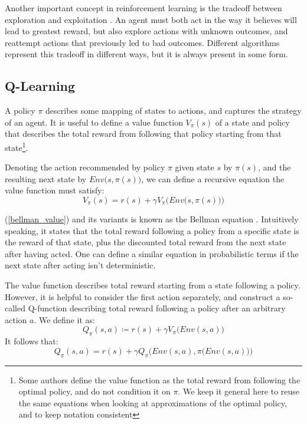 Another important concept in reinforcement learning is the tradeoff between exploration and exploitation \cite[chapter 2.1]{Sutton}. An agent must both act in the way it believes will lead to greatest reward, but also explore actions with unknown outcomes, and reattempt actions that previously led to bad outcomes. Different algorithms represent this tradeoff in different ways, but it is always present in some form.

\subsection{Q-Learning}
A policy $\pi$ describes some mapping of states to actions, and captures the strategy of an agent. It is useful to define a value function $V_{\pi}(s)$ of a state and policy that describes the total reward from following that policy starting from that state\footnote{Some authors define the value function as the total reward from following the optimal policy, and do not condition it on $\pi$. We keep it general here to reuse the same equations when looking at approximations of the optimal policy, and to keep notation consistent}.

Denoting the action recommended by policy $\pi$ given state $s$ by $\pi(s)$, and the resulting next state by $Env\big(s, \pi(s)\big)$, we can define a recursive equation the value function must satisfy:
\begin{equation}
\label{bellman_value}
    V_{\pi}(s) = r(s) + \gamma V_{\pi} \Big(Env\big(s, \pi(s)\big)\Big)
\end{equation}

(\ref{bellman_value}) and its variants is known as the Bellman equation \cite{BellmanEq}. Intuitively speaking, it states that the total reward following a policy from a specific state is the reward of that state, plus the discounted total reward from the next state after having acted. One can define a similar equation in probabilistic terms if the next state after acting isn't deterministic.

The value function describes total reward starting from a state following a policy. However, it is helpful to consider the first action separately, and construct a so-called Q-function describing total reward following a policy after an arbitrary action $a$. We define it as:
\begin{equation}
    Q_{\pi}(s, a) \coloneqq r(s) + \gamma V_{\pi}\big(Env(s, a)\big)
\end{equation}
It follows that:
\begin{equation}
\label{bellman_q}
    Q_{\pi}(s, a) = r(s) + \gamma Q_{\pi}\Big(Env(s, a), \pi\big(Env(s, a)\big)\Big)
\end{equation}

